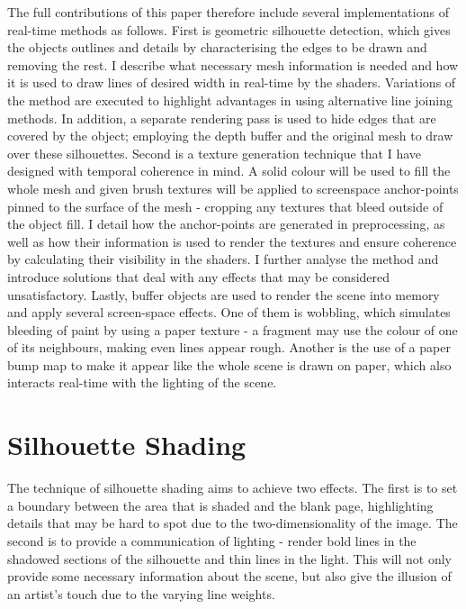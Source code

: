 \documentclass[a4paper,10pt]{article}
\begin{document}
The full contributions of this paper therefore include several implementations of real-time methods as follows. First is geometric silhouette detection, which gives the objects outlines and details by characterising the edges to be drawn and removing the rest. I describe what necessary mesh information is needed and how it is used to draw lines of desired width in real-time by the shaders. Variations of the method are executed to highlight advantages in using alternative line joining methods. In addition, a separate rendering pass is used to hide edges that are covered by the object; employing the depth buffer and the original mesh to draw over these silhouettes. Second is a texture generation technique that I have designed with temporal coherence in mind. A solid colour will be used to fill the whole mesh and given brush textures will be applied to screenspace anchor-points pinned to the surface of the mesh - cropping any textures that bleed outside of the object fill. I detail how the anchor-points are generated in preprocessing, as well as how their information is used to render the textures and ensure coherence by calculating their visibility in the shaders. I further analyse the method and introduce solutions that deal with any effects that may be considered unsatisfactory. Lastly, buffer objects are used to render the scene into memory and apply several screen-space effects. One of them is wobbling, which simulates bleeding of paint by using a paper texture - a fragment may use the colour of one of its neighbours, making even lines appear rough. Another is the use of a paper bump map to make it appear like the whole scene is drawn on paper, which also interacts real-time with the lighting of the scene.



\section{Silhouette Shading}

The technique of silhouette shading aims to achieve two effects. The first is to set a boundary between the area that is shaded and the blank page, highlighting details that may be hard to spot due to the two-dimensionality of the image. The second is to provide a communication of lighting - render bold lines in the shadowed sections of the silhouette and thin lines in the light. This will not only provide some necessary information about the scene, but also give the illusion of an artist's touch due to the varying line weights.
\end{document}
